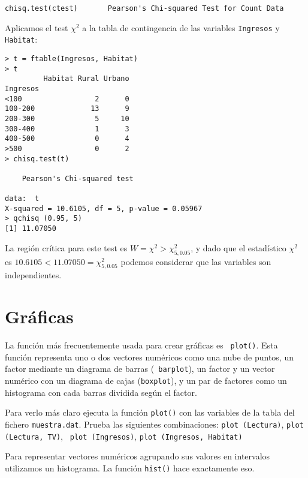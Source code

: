 \begin{verbatim}
chisq.test(ctest)       Pearson's Chi-squared Test for Count Data
\end{verbatim}

Aplicamos  el  test  $\chi^2$  a  la  tabla  de  contingencia  de  las
variables {\tt Ingresos} y {\tt Habitat}:


\begin{verbatim}
> t = ftable(Ingresos, Habitat)
> t
         Habitat Rural Urbano
Ingresos                     
<100                 2      0
100-200             13      9
200-300              5     10
300-400              1      3
400-500              0      4
>500                 0      2
> chisq.test(t)

	Pearson's Chi-squared test

data:  t 
X-squared = 10.6105, df = 5, p-value = 0.05967
> qchisq (0.95, 5)
[1] 11.07050
\end{verbatim}

La región crítica para este test  es $W = {\chi^2 > \chi^2_{5,0.05}}$,
y  dado   que  el   estadístico  $\chi^2$   es  $10.6105   <  11.07050
=   \chi^2_{5,0.05}$  podemos   considerar  que   las  variables   son
independientes.

\section{Gráficas}


La  función  más frecuentemente  usada  para  crear gráficas  es  {\tt
plot()}. Esta función representa uno o dos vectores numéricos como una
nube  de  puntos, un  factor  mediante  un  diagrama de  barras  ({\tt
barplot}), un  factor y un  vector numérico  con un diagrama  de cajas
({\tt boxplot}),  y un  par de  factores como  un histograma  con cada
barras dividida según el factor.

Para verlo más claro ejecuta la función {\tt plot()} con las variables
de  la tabla  del  fichero {\tt  muestra.dat}.  Prueba las  siguientes
combinaciones: {\tt  plot (Lectura)},  {\tt plot (Lectura,  TV)}, {\tt
plot (Ingresos)}, {\tt plot (Ingresos, Habitat)}



Para  representar   vectores  numéricos   agrupando  sus   valores  en
intervalos  utilizamos un  histograma.  La función  {\tt hist()}  hace
exactamente eso.


